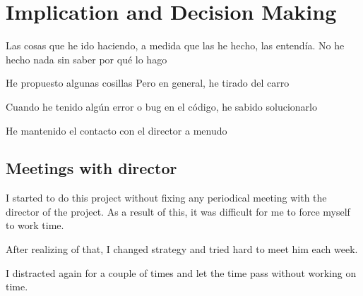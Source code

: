 \documentclass{article}
\begin{document}

\section{Implication and Decision Making}



    Las cosas que he ido haciendo, a medida que las he hecho, las entendía.
    No he hecho nada sin saber por qué lo hago

    He propuesto algunas cosillas
    Pero en general, he tirado del carro

    Cuando he tenido algún error o bug en el código, he sabido solucionarlo

    He mantenido el contacto con el director a menudo


    \subsection{Meetings with director}

    I started to do this project without fixing any periodical meeting with
    the director of the project. As a result of this, it was difficult for me to
    force myself to work time.

    After realizing of that, I changed strategy and tried hard to meet him each
    week.

    I distracted again for a couple of times and let the time pass without
    working on time.
\end{document}
